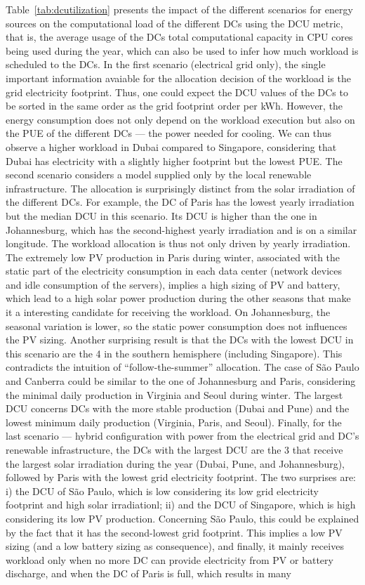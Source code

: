 Table~\ref{tab:dcutilization} presents the impact of the different scenarios for energy sources on the computational load of the different DCs using the DCU metric, that is, the average usage of the DCs total computational capacity in CPU cores being used during the year, which can also be used to infer how much workload is scheduled to the DCs. In the first scenario (electrical grid only), the single important information avaiable for the allocation decision of the workload is the grid electricity footprint. Thus, one could expect the DCU values of the DCs to be sorted in the same order as the grid footprint order per kWh. However, the energy consumption does not only depend on the workload execution but also on the PUE of the different DCs --- the power needed for cooling. We can thus observe a higher workload in Dubai compared to Singapore, considering that Dubai has electricity with a slightly higher footprint but the lowest PUE. The second scenario considers a model supplied only by the local renewable infrastructure. The allocation is surprisingly distinct from the solar irradiation of the different DCs. For example, the DC of Paris has the lowest yearly irradiation but the median DCU in this scenario. Its DCU is higher than the one in Johannesburg, which has the second-highest yearly irradiation and is on a similar longitude. The workload allocation is thus not only driven by yearly irradiation. The extremely low PV production in Paris during winter, associated with the static part of the electricity consumption in each data center (network devices and idle consumption of the servers), implies a high sizing of PV and battery, which lead to a high solar power production during the other seasons that make it a interesting candidate for receiving the workload. On Johannesburg, the seasonal variation is lower, so the static power consumption does not influences the PV sizing. Another surprising result is that the DCs with the lowest DCU in this scenario are the 4 in the southern hemisphere (including Singapore). This contradicts the intuition of ``follow-the-summer'' allocation. The case of S\~ao Paulo and Canberra could be similar to the one of Johannesburg and Paris, considering the minimal daily production in Virginia and Seoul during winter. The largest DCU concerns DCs with the more stable production (Dubai and Pune) and the lowest minimum daily production (Virginia, Paris, and Seoul). Finally, for the last scenario --- hybrid configuration with power from the electrical grid and DC's renewable infrastructure, the DCs with the largest DCU are the 3 that receive the largest solar irradiation during the year (Dubai, Pune, and Johannesburg), followed by Paris with the lowest grid electricity footprint. The two surprises are: i) the DCU of S\~ao Paulo, which is low considering its low grid electricity footprint and high solar irradiationl; ii) and the DCU of Singapore, which is high considering its low PV production. Concerning S\~ao Paulo, this could be explained by the fact that it has the second-lowest grid footprint. This implies a low PV sizing (and a low battery sizing as consequence), and finally, it mainly receives workload only when no more DC can provide electricity from PV or battery discharge, and when the DC of Paris is full, which results in many 